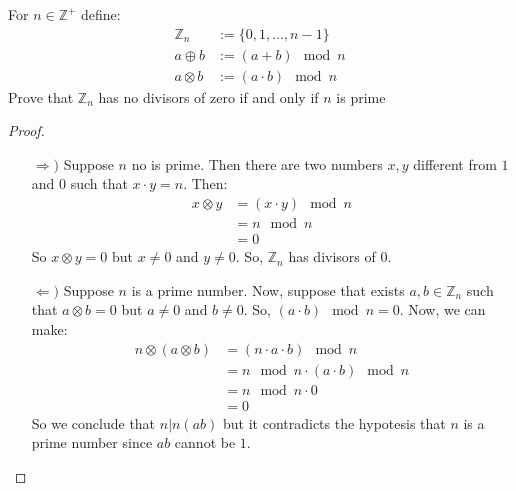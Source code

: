 \documentclass{tufte-handout}
\begin{document}
\begin{problem}
	For $n \in \mathbb{Z}^+$ define:
	\begin{align*}
		\mathbb{Z}_n &:= \{0, 1, \dots, n-1\}\\
		a \oplus b &:= (a+b) \mod n\\
		a \otimes b &:= (a \cdot b) \mod n
	\end{align*}
	Prove that $\mathbb{Z}_n$ has no divisors of zero if and only if $n$ is prime 
\end{problem}
\begin{proof}
	\begin{itemize}
		\item[$\Rightarrow)$] Suppose $n$ no is prime. Then there are two numbers $x, y$ different from $1$ and $0$ such that $x \cdot y = n$. Then:
		\begin{align*}
			x \otimes y &= (x \cdot y) \mod n\\
			&= n \mod n\\
			&= 0
		\end{align*}
		So $x \otimes y = 0$ but $x \neq 0$ and $y \neq 0$. So, $\mathbb{Z}_n$ has divisors of $0$.
		\item[$\Leftarrow)$] Suppose $n$ is a prime number. Now, suppose that exists $a, b \in \mathbb{Z}_n$ such that $a \otimes b = 0$ but $a \neq 0$ and $b \neq 0$. So, $(a \cdot b) \mod n = 0$. Now, we can make:
		\begin{align*}
			n \otimes (a \otimes b) &= (n \cdot a \cdot b) \mod n\\
			&= n \mod n \cdot (a \cdot b) \mod n\\
			&= n \mod n \cdot 0\\
			&= 0
		\end{align*}
		So we conclude that $n | n(ab)$ but it contradicts the hypotesis that $n$ is a prime number since $ab$ cannot be $1$. 
	\end{itemize}
\end{proof}
\end{document}
